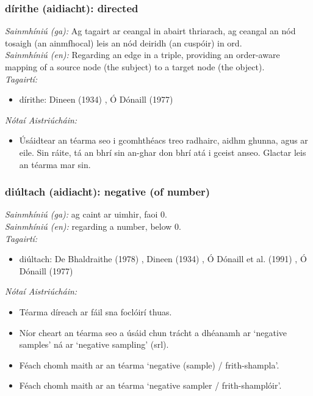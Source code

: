 \subsubsection*{dírithe (aidiacht): directed}
 \noindent \textit{Sainmhíniú (ga):} Ag tagairt ar ceangal in abairt thriarach, ag ceangal an nód tosaigh (an ainmfhocal) leis an nód deiridh (an cuspóir) in ord.
\\
 \noindent \textit{Sainmhíniú (en):} Regarding an edge in a triple, providing an order-aware mapping of a source node (the subject) to a target node (the object).
\\
 \noindent \textit{Tagairtí:}
\begin{itemize}
	\item dírithe: Dineen (1934) \cite{dineen}, Ó Dónaill (1977) \cite{odonaill}
\end{itemize}

 \noindent \textit{Nótaí Aistriúcháin:}
\begin{itemize}
	\item Úsáidtear an téarma seo i gcomhthéacs treo radhairc, aidhm ghunna, agus ar eile. Sin ráite, tá an bhrí sin an-ghar don bhrí atá i gceist anseo. Glactar leis an téarma mar sin.
\end{itemize}


\subsubsection*{diúltach (aidiacht): negative (of number)}
 \noindent \textit{Sainmhíniú (ga):} ag caint ar uimhir, faoi 0.
\\
 \noindent \textit{Sainmhíniú (en):} regarding a number, below 0.
\\
 \noindent \textit{Tagairtí:}
\begin{itemize}
	\item diúltach: De Bhaldraithe (1978) \cite{de-bhaldraithe}, Dineen (1934) \cite{dineen}, Ó Dónaill et al. (1991) \cite{focloir-beag}, Ó Dónaill (1977) \cite{odonaill}
\end{itemize}

 \noindent \textit{Nótaí Aistriúcháin:}
\begin{itemize}
	\item Téarma díreach ar fáil sna foclóirí thuas.
	\item Níor cheart an téarma seo a úsáid chun trácht a dhéanamh ar `negative samples' ná ar `negative sampling' (srl).
	\item Féach chomh maith ar an téarma `negative (sample) / frith-shampla'.
	\item Féach chomh maith ar an téarma `negative sampler / frith-shamplóir'.
\end{itemize}


